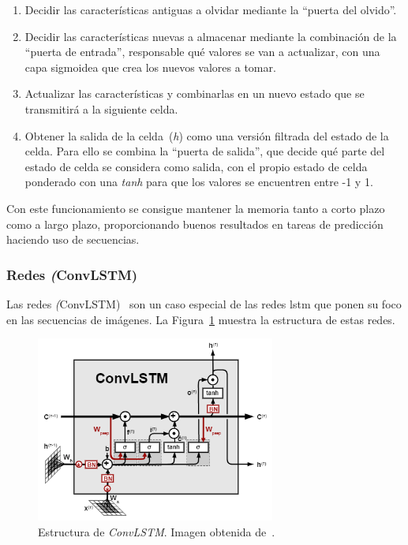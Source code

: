 \begin{enumerate}
    \item Decidir las características antiguas a olvidar mediante la ``puerta del olvido''.
    \item Decidir las características nuevas a almacenar mediante la combinación de la ``puerta de entrada'', responsable qué valores se van a actualizar, con una capa sigmoidea que crea los nuevos valores a tomar.
    \item Actualizar las características y combinarlas en un nuevo estado que se transmitirá a la siguiente celda.
    \item Obtener la salida de la celda~(\textit{h}) como una versión filtrada del estado de la celda. Para ello se combina la ``puerta de salida'', que decide qué parte del estado de celda se considera como salida, con el propio estado de celda ponderado con una \textit{tanh} para que los valores se encuentren entre -1 y 1.
\end{enumerate}

Con este funcionamiento se consigue mantener la memoria tanto a corto plazo como a largo plazo, proporcionando buenos resultados en tareas de predicción haciendo uso de secuencias.

\subsubsection{Redes \textit(ConvLSTM)} \label{ap.convLSTM}
Las redes \textit(ConvLSTM)~\cite{DBLP:journals/corr/ShiCWYWW15} son un caso especial de las redes \acrshort{lstm} que ponen su foco en las secuencias de imágenes. La Figura~\ref{fig.convlstm} muestra la estructura de estas redes.

\vspace{10pt}
\begin{figure}[H]
	\begin{center}
		\includegraphics[width=0.7\textwidth]{ figures/intro/convLSTM.png}
		\caption{Estructura de \textit{ConvLSTM}. Imagen obtenida de~\cite{convlstm}.
		}
		\label{fig.convlstm}
	\end{center}
\end{figure}
\vspace{-10pt}

